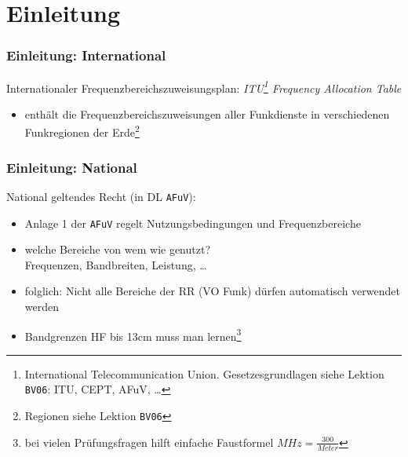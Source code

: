 

\subtitle{Betriebstechnik/Vorschriften 09: \\
  Betriebsarten, Sendearten, Frequenzen \\[2em]}
\date{Stand 21.11.2016}



\section{Einleitung}

\begin{frame}
  \frametitle{Einleitung: International}

  Internationaler Frequenzbereichszuweisungsplan:
  \emph{ITU\footnote{International Telecommunication Union.
  Gesetzesgrundlagen siehe Lektion \texttt{BV06}: ITU, CEPT, AFuV, \ldots} Frequency
  Allocation Table}

  \begin{itemize}
    \item enthält die Frequenzbereichszuweisungen aller Funkdienste in
      verschiedenen Funkregionen der Erde\footnote{Regionen siehe Lektion \texttt{BV06}}
  \end{itemize}

\end{frame}

\begin{frame}
  \frametitle{Einleitung: National}

  National geltendes Recht (in DL \texttt{AFuV}):

  \begin{itemize}
    \item Anlage 1 der \texttt{AFuV} regelt Nutzungsbedingungen und Frequenzbereiche
    \item welche Bereiche von wem wie genutzt? \\
      Frequenzen, Bandbreiten, Leistung, \ldots
    \item folglich: Nicht alle Bereiche der RR (VO Funk) dürfen automatisch
      verwendet werden
    \item Bandgrenzen HF bis 13cm muss man lernen\footnote{bei vielen
      Prüfungsfragen hilft einfache Faustformel $MHz = \frac{300}{Meter}$}
  \end{itemize}

\end{frame}

